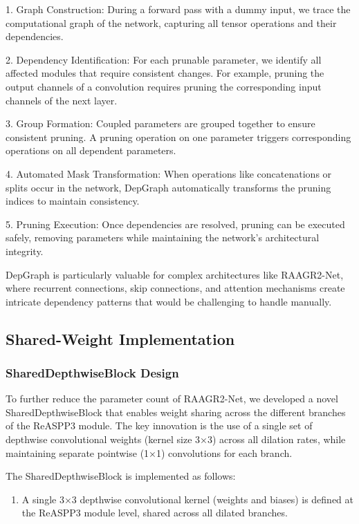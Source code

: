 \documentclass[12pt,a4paper]{article}
\begin{document}
\begin{enumerate}
1. Graph Construction: During a forward pass with a dummy input, we trace the computational graph of the network, capturing all tensor operations and their dependencies.

2. Dependency Identification: For each prunable parameter, we identify all affected modules that require consistent changes. For example, pruning the output channels of a convolution requires pruning the corresponding input channels of the next layer.

3. Group Formation: Coupled parameters are grouped together to ensure consistent pruning. A pruning operation on one parameter triggers corresponding operations on all dependent parameters.

4. Automated Mask Transformation: When operations like concatenations or splits occur in the network, DepGraph automatically transforms the pruning indices to maintain consistency.

5. Pruning Execution: Once dependencies are resolved, pruning can be executed safely, removing parameters while maintaining the network's architectural integrity.

DepGraph is particularly valuable for complex architectures like RAAGR2-Net, where recurrent connections, skip connections, and attention mechanisms create intricate dependency patterns that would be challenging to handle manually.

\subsection{Shared-Weight Implementation}

\subsubsection{SharedDepthwiseBlock Design}

To further reduce the parameter count of RAAGR2-Net, we developed a novel SharedDepthwiseBlock that enables weight sharing across the different branches of the ReASPP3 module. The key innovation is the use of a single set of depthwise convolutional weights (kernel size 3×3) across all dilation rates, while maintaining separate pointwise (1×1) convolutions for each branch.

The SharedDepthwiseBlock is implemented as follows:

\begin{enumerate}
\item A single 3×3 depthwise convolutional kernel (weights and biases) is defined at the ReASPP3 module level, shared across all dilated branches.


\end{enumerate}
\end{enumerate}
\end{document}

